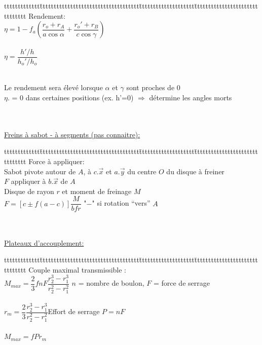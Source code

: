 \begin{bluebox}
\begin{tabbing}
ttttttttttttt\=tttttttttttttttttttttttttttttttttttt\=tttttttttttttttttttt\=ttttttttttttttttttttttttttttttt\kill
Rendement:\\
\>$\eta = 1-f_a(\dfrac{r_o+r_A}{a\cos\alpha}+\dfrac{r_o'+r_B}{c\cos\gamma})$\\\\
\>$\eta = \dfrac{h'/h}{h_o'/h_o}$\\\\
\begin{orangebox}
Le rendement sera élevé lorsque $\alpha$ et $\gamma$ sont proches de 0\\
$\eta$. = 0 dans certaines positions (ex. h’=0) $\Rightarrow$ détermine les {\color{orange}angles morts} 
\end{orangebox}
\end{tabbing}
\end{bluebox}\\\\

\underline{Freins à sabot - à segments (pas connaitre):}\\

\begin{bluebox}
\begin{tabbing}
ttttttttttttt\=tttttttttttttttttttttttttttttttttttt\=tttttttttttttttttttt\=ttttttttttttttttttttttttttttttt\kill
Force à appliquer:\\
\>Sabot pivote autour de $A$, à $c.\vec{x}$ et $a.\vec{y}$ du centre $O$ du disque à freiner\\
\>$F$ appliquer à $b.\vec{x}$ de $A$\\
\>Disque de rayon $r$ et moment de freinage $M$\\
\>$F=[c\pm f(a-c)]\dfrac{M}{bfr}$\> "$-$" si rotation “vers” $A$
\end{tabbing}
\end{bluebox}\\\\

\underline{Plateaux d’accouplement:}\\

\begin{bluebox}
\begin{tabbing}
ttttttttttttt\=tttttttttttttttttttttttttttttttttttt\=tttttttttttttttttttt\=ttttttttttttttttttttttttttttttt\kill
Couple maximal transmissible :\\
\>$M_{max}=\dfrac{2}{3}fnF\dfrac{r^3_2-r^3_1}{r^2_2-r^2_1}$\> $n$ = nombre de boulon, $F$ = force de serrage\\\\
\>$r_m = \dfrac{2}{3}\dfrac{r^3_2-r^3_1}{r^2_2-r^2_1}$\>Effort de serrage $P=nF$\\\\
\>$M_{max}=fPr_m$
\end{tabbing}
\end{bluebox}\\\\

